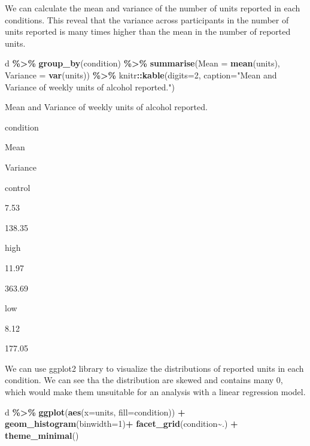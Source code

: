 \documentclass[
]{book}
\newenvironment{Shaded}{\begin{snugshade}}{\end{snugshade}}
\newcommand{\AttributeTok}[1]{\textcolor[rgb]{0.13,0.29,0.53}{#1}}
\newcommand{\DecValTok}[1]{\textcolor[rgb]{0.00,0.00,0.81}{#1}}
\newcommand{\FunctionTok}[1]{\textcolor[rgb]{0.13,0.29,0.53}{\textbf{#1}}}
\newcommand{\NormalTok}[1]{#1}
\newcommand{\SpecialCharTok}[1]{\textcolor[rgb]{0.81,0.36,0.00}{\textbf{#1}}}
\newcommand{\StringTok}[1]{\textcolor[rgb]{0.31,0.60,0.02}{#1}}
\begin{document}
We can calculate the mean and variance of the number of units reported in each conditions. This reveal that the variance across participants in the number of units reported is many times higher than the mean in the number of reported units.

\begin{Shaded}
\begin{Highlighting}[]
\NormalTok{d }\SpecialCharTok{\%\textgreater{}\%}
  \FunctionTok{group\_by}\NormalTok{(condition) }\SpecialCharTok{\%\textgreater{}\%}
  \FunctionTok{summarise}\NormalTok{(}\AttributeTok{Mean =} \FunctionTok{mean}\NormalTok{(units),}
            \AttributeTok{Variance =} \FunctionTok{var}\NormalTok{(units)) }\SpecialCharTok{\%\textgreater{}\%}
\NormalTok{  knitr}\SpecialCharTok{::}\FunctionTok{kable}\NormalTok{(}\AttributeTok{digits=}\DecValTok{2}\NormalTok{,}
               \AttributeTok{caption=}\StringTok{"Mean and Variance of weekly units of alcohol reported."}\NormalTok{)}
\end{Highlighting}
\end{Shaded}

\label{tab:unnamed-chunk-5}Mean and Variance of weekly units of alcohol reported.

condition

Mean

Variance

control

7.53

138.35

high

11.97

363.69

low

8.12

177.05

We can use ggplot2 library to visualize the distributions of reported units in each condition. We can see tha the distribution are skewed and contains many 0, which would make them unsuitable for an analysis with a linear regression model.

\begin{Shaded}
\begin{Highlighting}[]
\NormalTok{d }\SpecialCharTok{\%\textgreater{}\%}
  \FunctionTok{ggplot}\NormalTok{(}\FunctionTok{aes}\NormalTok{(}\AttributeTok{x=}\NormalTok{units, }\AttributeTok{fill=}\NormalTok{condition)) }\SpecialCharTok{+}
  \FunctionTok{geom\_histogram}\NormalTok{(}\AttributeTok{binwidth=}\DecValTok{1}\NormalTok{)}\SpecialCharTok{+}
  \FunctionTok{facet\_grid}\NormalTok{(condition}\SpecialCharTok{\textasciitilde{}}\NormalTok{.) }\SpecialCharTok{+}
  \FunctionTok{theme\_minimal}\NormalTok{() }
\end{Highlighting}
\end{Shaded}
\end{document}
